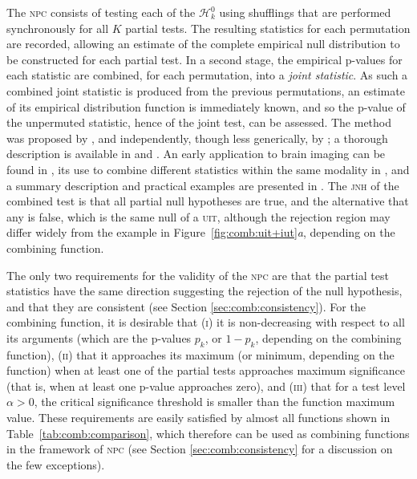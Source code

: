 The \textsc{npc} consists of testing each of the $\mathcal{H}^0_k$ using shufflings that are performed synchronously for all $K$ partial tests. The resulting statistics for each permutation are recorded, allowing an estimate of the complete empirical null distribution to be constructed for each partial test. In a second stage, the empirical p-values for each statistic are combined, for each permutation, into a \emph{joint statistic}. As such a combined joint statistic is produced from the previous permutations, an estimate of its empirical distribution function is immediately known, and so the p-value of the unpermuted statistic, hence of the joint test, can be assessed. The method was proposed by \citet{Pesarin1990, Pesarin1992}, and independently, though less generically, by \citet{Blair1993, Blair1994}; a thorough description is available in \citet{Pesarin2001} and \citet{Pesarin2010}. An early application to brain imaging can be found in \citet{Hayasaka2006}, its use to combine different statistics within the same modality in \citet{hayasaka2004_combining}, and a summary description and practical examples are presented in \citet{Brombin2013}. The \textsc{jnh} of the combined test is that all partial null hypotheses are true, and the alternative that any is false, which is the same null of a \textsc{uit}, although the rejection region may differ widely from the example in Figure~\ref{fig:comb:uit+iut}\emph{a}, depending on the combining function.

The only two requirements for the validity of the \textsc{npc} are that the partial test statistics have the same direction suggesting the rejection of the null hypothesis, and that they are consistent (see Section \ref{sec:comb:consistency}). For the combining function, it is desirable that (\textsc{i}) it is non-decreasing with respect to all its arguments (which are the p-values $p_k$, or $1-p_k$, depending on the combining function), (\textsc{ii}) that it approaches its maximum (or minimum, depending on the function) when at least one of the partial tests approaches maximum significance (that is, when at least one p-value approaches zero), and (\textsc{iii}) that for a test level $\alpha > 0$, the critical significance threshold is smaller than the function maximum value. These requirements are easily satisfied by almost all functions shown in Table~\ref{tab:comb:comparison}, which therefore can be used as combining functions in the framework of \textsc{npc} (see Section \ref{sec:comb:consistency} for a discussion on the few exceptions).


